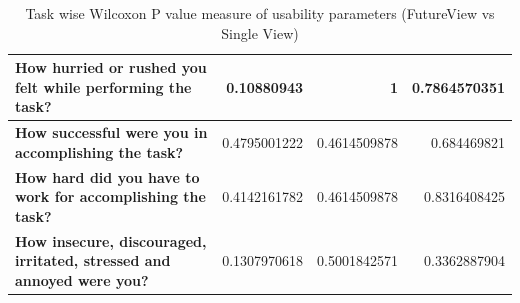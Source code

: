 \documentclass[english]{tktltiki}
\begin{document}
\begin{table}
\begin{center}
\begin{tabular}{|p{6cm}|r|r|r|}
        \textbf{How hurried or rushed you felt while performing the task?} & 0.10880943 & 1 & 0.7864570351 \\
        \hline
        
        \textbf{How successful were you in accomplishing the task?} & 0.4795001222 & 0.4614509878 & 0.684469821 \\
        \hline
        
        \textbf{How hard did you have to work for accomplishing the task?} & 0.4142161782 & 0.4614509878 & 0.8316408425 \\
        \hline
        
        \textbf{How insecure, discouraged, irritated, stressed and annoyed were you?} & 0.1307970618 & 0.5001842571 & 0.3362887904 \\
        \hline
        
    \end{tabular}
	\end{center}
	\caption{Task wise Wilcoxon P value measure of usability parameters (FutureView vs Single View)}
    \label{table:use_wilcox_task}
\end{table}






\nocite{*}


\end{document}
